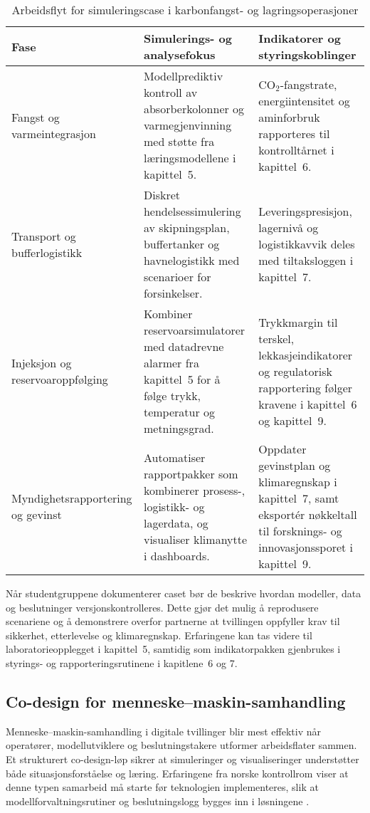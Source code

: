 \begin{table}[htbp]
    \centering
    \caption{Arbeidsflyt for simuleringscase i karbonfangst- og lagringsoperasjoner}
    \label{tab:kap04-ccs-simulering}
    \begin{tabular}{p{}p{}p{}}
        \toprule
        \textbf{Fase} & \textbf{Simulerings- og analysefokus} & \textbf{Indikatorer og styringskoblinger}\\
        \midrule
        Fangst og varmeintegrasjon & Modellprediktiv kontroll av absorberkolonner og varmegjenvinning med støtte fra læringsmodellene i kapittel~5. & CO$_2$-fangstrate, energiintensitet og aminforbruk rapporteres til kontrolltårnet i kapittel~6.\\
        \addlinespace
        Transport og bufferlogistikk & Diskret hendelsessimulering av skipningsplan, buffertanker og havnelogistikk med scenarioer for forsinkelser. & Leveringspresisjon, lagernivå og logistikkavvik deles med tiltaksloggen i kapittel~7.\\
        \addlinespace
        Injeksjon og reservoaroppfølging & Kombiner reservoarsimulatorer med datadrevne alarmer fra kapittel~5 for å følge trykk, temperatur og metningsgrad. & Trykkmargin til terskel, lekkasjeindikatorer og regulatorisk rapportering følger kravene i kapittel~6 og kapittel~9.\\
        \addlinespace
        Myndighetsrapportering og gevinst & Automatiser rapportpakker som kombinerer prosess-, logistikk- og lagerdata, og visualiser klimanytte i dashboards. & Oppdater gevinstplan og klimaregnskap i kapittel~7, samt eksportér nøkkeltall til forsknings- og innovasjonssporet i kapittel~9.\\
        \bottomrule
    \end{tabular}
\end{table}

Når studentgruppene dokumenterer caset bør de beskrive hvordan modeller, data og beslutninger versjonskontrolleres. Dette gjør det mulig å reprodusere scenariene og å demonstrere overfor partnerne at tvillingen oppfyller krav til sikkerhet, etterlevelse og klimaregnskap. Erfaringene kan tas videre til laboratorieopplegget i kapittel~5, samtidig som indikatorpakken gjenbrukes i styrings- og rapporteringsrutinene i kapitlene~6 og 7.

\subsection{Co-design for menneske--maskin-samhandling}
Menneske--maskin-samhandling i digitale tvillinger blir mest effektiv når operatører, modellutviklere og beslutningstakere utformer arbeidsflater sammen. Et strukturert co-design-løp sikrer at simuleringer og visualiseringer understøtter både situasjonsforståelse og læring. Erfaringene fra norske kontrollrom viser at denne typen samarbeid må starte før teknologien implementeres, slik at modellforvaltningsrutiner og beslutningslogg bygges inn i løsningene \citep{kongsberg2023kognitwin,statnett2024kontrolltarn}.

